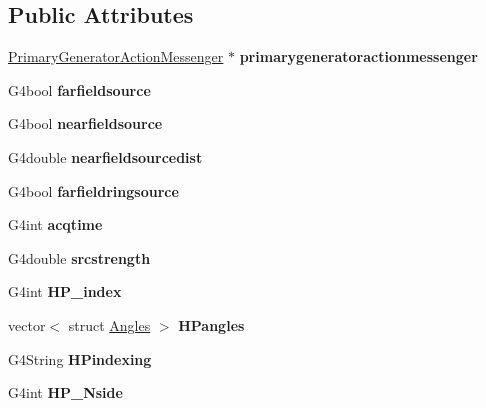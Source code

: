 \subsection*{Public Attributes}
\begin{DoxyCompactItemize}
\item 
\hypertarget{class_primary_generator_action_addbbfc036b0156bb95d8e3daaae32490}{}\label{class_primary_generator_action_addbbfc036b0156bb95d8e3daaae32490} 
\hyperlink{class_primary_generator_action_messenger}{Primary\+Generator\+Action\+Messenger} $\ast$ {\bfseries primarygeneratoractionmessenger}
\item 
\hypertarget{class_primary_generator_action_a0cdcb956930b68ca7eb21000715cebb9}{}\label{class_primary_generator_action_a0cdcb956930b68ca7eb21000715cebb9} 
G4bool {\bfseries farfieldsource}
\item 
\hypertarget{class_primary_generator_action_a3f3c1be1aa74fbdb95394d326b229e87}{}\label{class_primary_generator_action_a3f3c1be1aa74fbdb95394d326b229e87} 
G4bool {\bfseries nearfieldsource}
\item 
\hypertarget{class_primary_generator_action_a6f61ce8b96e9296c10d05faf8da6c7cc}{}\label{class_primary_generator_action_a6f61ce8b96e9296c10d05faf8da6c7cc} 
G4double {\bfseries nearfieldsourcedist}
\item 
\hypertarget{class_primary_generator_action_a8bb37f211e060d53d08892ac18e1c032}{}\label{class_primary_generator_action_a8bb37f211e060d53d08892ac18e1c032} 
G4bool {\bfseries farfieldringsource}
\item 
\hypertarget{class_primary_generator_action_a856a6e25eaad9b8b6b06648bb11a7dc2}{}\label{class_primary_generator_action_a856a6e25eaad9b8b6b06648bb11a7dc2} 
G4int {\bfseries acqtime}
\item 
\hypertarget{class_primary_generator_action_ae79ffa0cb555fe839f318ed9fc522dd0}{}\label{class_primary_generator_action_ae79ffa0cb555fe839f318ed9fc522dd0} 
G4double {\bfseries srcstrength}
\item 
\hypertarget{class_primary_generator_action_a7b2a99da413dfd7fd3a45ebec3083e85}{}\label{class_primary_generator_action_a7b2a99da413dfd7fd3a45ebec3083e85} 
G4int {\bfseries H\+P\+\_\+index}
\item 
\hypertarget{class_primary_generator_action_a3f240345a5071bc7993dafdcfb68d088}{}\label{class_primary_generator_action_a3f240345a5071bc7993dafdcfb68d088} 
vector$<$ struct \hyperlink{struct_angles}{Angles} $>$ {\bfseries H\+Pangles}
\item 
\hypertarget{class_primary_generator_action_a87d3b8eab8564f086272a3f1159c76aa}{}\label{class_primary_generator_action_a87d3b8eab8564f086272a3f1159c76aa} 
G4\+String {\bfseries H\+Pindexing}
\item 
\hypertarget{class_primary_generator_action_a2cbc70d41722fa952536b7649e75eb09}{}\label{class_primary_generator_action_a2cbc70d41722fa952536b7649e75eb09} 
G4int {\bfseries H\+P\+\_\+\+Nside}
\end{DoxyCompactItemize}
